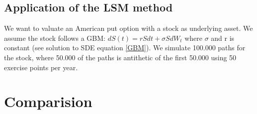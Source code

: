 \subsection{Application of the LSM method}
We want to valuate an American put option with a stock as underlying asset. We assume the stock follows a GBM: $dS(t)=rSdt + \sigma S dW_t$ where $\sigma$ and r is constant (see solution to SDE equation \ref{GBM}). We simulate 100.000 paths for the stock, where 50.000 of the paths is antithetic of the first 50.000 using 50 exercise points per year.

\parencite{lsm}  

\section{Comparision}

